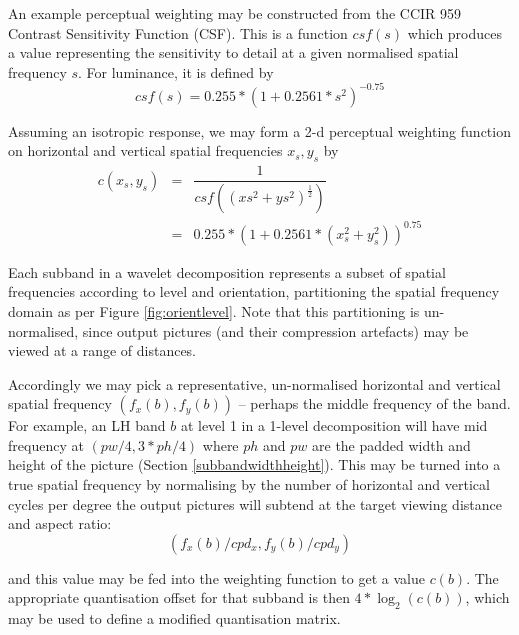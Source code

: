 \begin{informative*}
An example perceptual weighting may be constructed from the CCIR 959 Contrast Sensitivity
Function (CSF). This is a function $csf(s)$ which produces a value representing the
sensitivity to detail at a given normalised spatial frequency $s$. For luminance, it is defined
by 
\[csf(s)=0.255*(1+0.2561*s^2)^{-0.75}\]

Assuming an isotropic response, we may form a 2-d perceptual weighting function on 
horizontal and vertical spatial frequencies $x_s,y_s$ by
\begin{eqnarray*}
c(x_s,y_s) & = & \dfrac{1}{csf((xs^2+ys^2)^{\frac{1}{2}})} \\
& = & 0.255*(1+0.2561*(x_s^2+y_s^2))^{0.75}
\end{eqnarray*}

Each subband in a wavelet decomposition represents a subset of spatial frequencies according
to level and orientation, partitioning the spatial frequency domain as per Figure \ref{fig:orientlevel}.
Note that this partitioning is un-normalised, since output pictures (and their compression artefacts) may
be viewed at a range of distances. 

Accordingly we may pick a representative, un-normalised horizontal and vertical spatial frequency $(f_x(b),f_y(b))$ -- perhaps the middle frequency of the band. For example, an LH band $b$ at level 1 in a 1-level 
decomposition will have mid frequency at $(pw/4,3*ph/4)$ where $ph$ and $pw$ are the padded
width and height of the picture (Section \ref{subbandwidthheight}). This may be turned into a true
spatial frequency by normalising by the number of horizontal and vertical cycles per degree the output
pictures will subtend at the target viewing distance and aspect ratio:
\[ (f_x(b)/cpd_x,f_y(b)/cpd_y)\]

and this value may be fed into the weighting function to get a value $c(b)$. The appropriate
quantisation offset for that subband is then $4*\log_2(c(b))$, which may be used to define a modified
quantisation matrix.

\end{informative*}